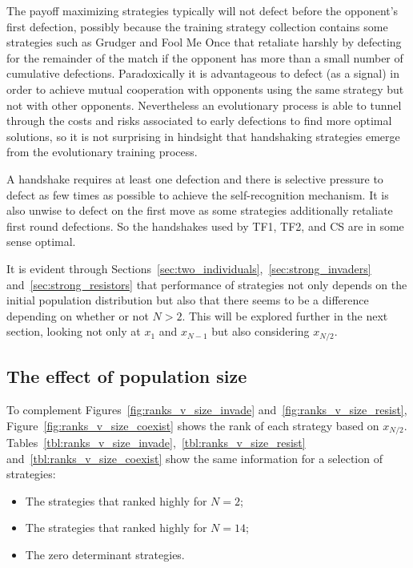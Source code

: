 \documentclass[10pt,journal]{IEEEtran}
\begin{document}
The payoff maximizing strategies typically will not defect before the opponent's
first defection, possibly because the training strategy collection contains some
strategies such as Grudger and Fool Me Once that retaliate harshly by defecting
for the remainder of the match if the opponent has more than a small number of
cumulative defections. Paradoxically it is advantageous to defect (as a signal)
in order to achieve mutual cooperation with opponents using the same strategy
but not with other opponents. Nevertheless an evolutionary process is able to
tunnel through the costs and risks associated to early defections to find more
optimal solutions, so it is not surprising in hindsight that handshaking
strategies emerge from the evolutionary training process.

A handshake requires at least one defection and there is
selective pressure to defect as few times as possible to achieve the
self-recognition mechanism. It is also unwise to defect on the first move as
some strategies additionally retaliate first round defections. So the
handshakes used by TF1, TF2, and CS are in some sense optimal.

It is evident through
Sections~\ref{sec:two_individuals},~\ref{sec:strong_invaders}
and~\ref{sec:strong_resistors} that performance of strategies not only depends
on the initial population distribution but also that there seems to be a
difference depending on whether or not \(N>2\). This will be explored further in
the next section, looking not only at \(x_1\) and \(x_{N-1}\) but also
considering
\(x_{N/2}\).

\subsection{The effect of population size}\label{sec:population_size}

To complement Figures~\ref{fig:ranks_v_size_invade}
and~\ref{fig:ranks_v_size_resist}, Figure~\ref{fig:ranks_v_size_coexist} shows
the rank of each strategy based on \(x_{N/2}\).
Tables~\ref{tbl:ranks_v_size_invade},~\ref{tbl:ranks_v_size_resist}
and~\ref{tbl:ranks_v_size_coexist} show the same information for a selection of
strategies:

\begin{itemize}
    \item The strategies that ranked highly for \(N=2\);
    \item The strategies that ranked highly for \(N=14\);
    \item The zero determinant strategies.
\end{itemize}
\end{document}

